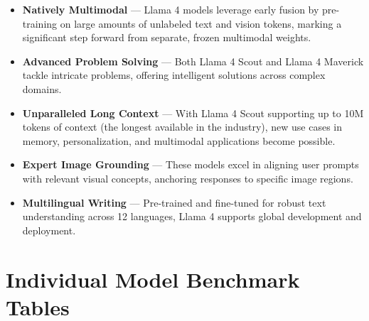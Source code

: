 \documentclass{scrartcl}
\begin{document}
\begin{itemize}
    \item \textbf{Natively Multimodal} --- Llama 4 models leverage early fusion by pre-training on large amounts of unlabeled text and vision tokens, marking a significant step forward from separate, frozen multimodal weights.
    \item \textbf{Advanced Problem Solving} --- Both Llama 4 Scout and Llama 4 Maverick tackle intricate problems, offering intelligent solutions across complex domains.
    \item \textbf{Unparalleled Long Context} --- With Llama 4 Scout supporting up to 10M tokens of context (the longest available in the industry), new use cases in memory, personalization, and multimodal applications become possible.
    \item \textbf{Expert Image Grounding} --- These models excel in aligning user prompts with relevant visual concepts, anchoring responses to specific image regions.
    \item \textbf{Multilingual Writing} --- Pre-trained and fine-tuned for robust text understanding across 12 languages, Llama 4 supports global development and deployment.
\end{itemize}

\bigskip

\section*{Individual Model Benchmark Tables}

\end{document}
